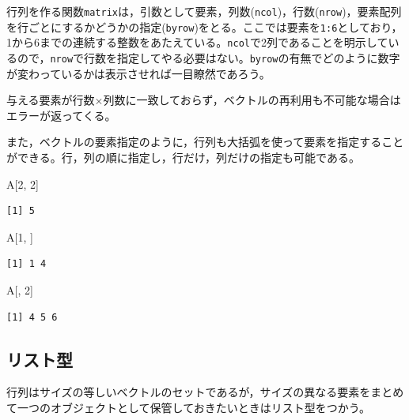 \documentclass[
  a4paper,
]{ltjsbook}
\newenvironment{Shaded}{\begin{snugshade}}{\end{snugshade}}
\newcommand{\DecValTok}[1]{\textcolor[rgb]{0.68,0.00,0.00}{#1}}
\newcommand{\NormalTok}[1]{\textcolor[rgb]{0.00,0.23,0.31}{#1}}
\begin{document}
行列を作る関数\texttt{matrix}は，引数として要素，列数(\texttt{ncol})，行数(\texttt{nrow})，要素配列を行ごとにするかどうかの指定(\texttt{byrow})をとる。ここでは要素を\texttt{1:6}としており，1から6までの連続する整数をあたえている。\texttt{ncol}で2列であることを明示しているので，\texttt{nrow}で行数を指定してやる必要はない。\texttt{byrow}の有無でどのように数字が変わっているかは表示させれば一目瞭然であろう。

与える要素が行数\(\times\)列数に一致しておらず，ベクトルの再利用も不可能な場合はエラーが返ってくる。

また，ベクトルの要素指定のように，行列も大括弧を使って要素を指定することができる。行，列の順に指定し，行だけ，列だけの指定も可能である。

\begin{Shaded}
\begin{Highlighting}[]
\NormalTok{A[}\DecValTok{2}\NormalTok{, }\DecValTok{2}\NormalTok{]}
\end{Highlighting}
\end{Shaded}

\begin{verbatim}
[1] 5
\end{verbatim}

\begin{Shaded}
\begin{Highlighting}[]
\NormalTok{A[}\DecValTok{1}\NormalTok{, ]}
\end{Highlighting}
\end{Shaded}

\begin{verbatim}
[1] 1 4
\end{verbatim}

\begin{Shaded}
\begin{Highlighting}[]
\NormalTok{A[, }\DecValTok{2}\NormalTok{]}
\end{Highlighting}
\end{Shaded}

\begin{verbatim}
[1] 4 5 6
\end{verbatim}

\subsection{リスト型}\label{ux30eaux30b9ux30c8ux578b}

行列はサイズの等しいベクトルのセットであるが，サイズの異なる要素をまとめて一つのオブジェクトとして保管しておきたいときはリスト型をつかう。
\end{document}
